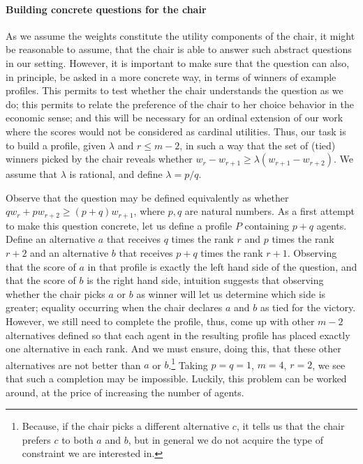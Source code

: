 \paragraph{Building concrete questions for the chair}
As we assume the weights constitute the utility components of the chair, it might be reasonable to assume, 
that the chair is able to answer such abstract questions in our setting. However, it is important to make sure that the question can also, in principle, be asked in a more concrete way, in terms of winners of example profiles. This permits to test whether the chair understands the question as we do; this permits to relate the preference of the chair  to her choice behavior in the economic sense; and this will be necessary for an ordinal extension of our work where the scores would not be considered as cardinal utilities.
Thus, our task is to build a profile, given $\lambda$ and $r ≤ m-2$, in such a way that the set of (tied) winners picked by the chair reveals whether $w_{r} - w_{r+1} \geq \lambda (w_{r+1} - w_{r+2})$.
We assume that $\lambda$ is rational, and define $\lambda = p/q$.

Observe that the question may be defined equivalently as whether $q w_{r} + p w_{r+2} ≥ (p + q) w_{r+1}$, where $p, q$ are natural numbers. 
As a first attempt to make this question concrete, let us define a profile $P$ containing $p+q$ agents. 
Define an alternative $a$ that receives $q$ times the rank $r$ and $p$ times the rank $r+2$ and an alternative $b$ that receives $p+q$ times the rank $r+1$. 
Observing that the score of $a$ in that profile is exactly the left hand side of the question, and that the score of $b$ is the right hand side, intuition suggests that observing whether the chair picks $a$ or $b$ as winner will let us determine which side is greater; equality occurring when the chair declares $a$ and $b$ as tied for the victory. 
However, we still need to complete the profile, thus, come up with other $m-2$ alternatives defined so that each agent in the resulting profile has placed exactly one alternative in each rank. 
And we must ensure, doing this, that these other alternatives are not better than $a$ or $b$.\footnote{Because, if the chair picks a different alternative $c$, it tells us that the chair prefers $c$ to both $a$ and $b$, 
but in general we do not acquire the type of constraint we are interested in.} 
Taking $p = q = 1$, $m=4$, $r=2$, we see that such a completion may be impossible. Luckily, this problem can be worked around, at the price of increasing the number of agents. 

